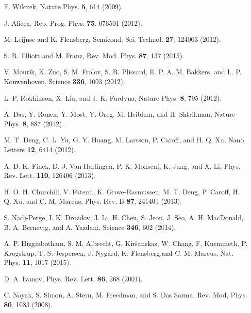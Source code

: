 \documentclass[aps, prb, showpacs, twocolumn, %
amssymb,superscriptaddress]{revtex4}
\begin{document}
\begin{thebibliography}{}

F. Wilczek, Nature Phys. {\bf 5},  614  (2009).

J. Alicea, Rep. Prog. Phys. {\bf 75},  076501  (2012).

M. Leijnse and K. Flensberg, Semicond. Sci. Technol. {\bf 27},  124003  (2012).

S. R. Elliott and M. Franz, Rev. Mod. Phys. {\bf 87}, 137 (2015).

V. Mourik, K. Zuo, S. M. Frolov, S. R. Plissard, E. P. A. M. Bakkers, and L. P. Kouwenhoven, Science {\bf 336},  1003  (2012).

L. P. Rokhinson, X. Liu, and J. K. Furdyna, Nature Phys. {\bf 8}, 795  (2012).

A. Das, Y. Ronen, Y. Most, Y. Oreg, M. Heiblum, and H. Shtrikman, Nature Phys. {\bf 8},  887  (2012).

M. T. Deng, C. L. Yu, G. Y. Huang, M. Larsson, P. Caroff, and H. Q. Xu, Nano Letters {\bf 12},  6414  (2012).

A. D. K. Finck, D. J. Van Harlingen, P. K. Mohseni, K. Jung, and X. Li, Phys. Rev. Lett. {\bf 110}, 126406 (2013).

H. O. H. Churchill, V. Fatemi, K. Grove-Rasmussen, M. T. Deng, P. Caroff, H. Q. Xu, and C. M. Marcus, Phys. Rev. B {\bf 87},  241401  (2013).

S. Nadj-Perge, I. K. Drozdov, J. Li, H. Chen, S. Jeon, J. Seo, A. H. MacDonald, B. A. Bernevig, and A. Yazdani, Science {\bf 346},  602  (2014).

A. P. Higginbotham, S. M. Albrecht, G. Kir\v{s}anskas, W. Chang, F. Kuemmeth, P. Krogstrup, T. S. Jespersen, J. Nyg\r{a}rd, K. Flensberg,and C. M. Marcus, Nat. Phys. {\bf 11}, 1017 (2015).

D. A. Ivanov, Phys. Rev. Lett. {\bf 86}, 268 (2001).

C. Nayak, S. Simon, A. Stern, M. Freedman, and S. Das Sarma, Rev. Mod, Phys. {\bf 80}, 1083 (2008).


\end{thebibliography}
\end{document}
